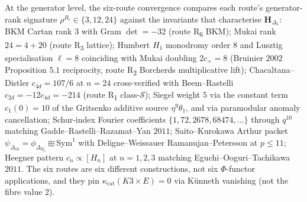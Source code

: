 \begin{remark}
\label{rem:cy-c-six-routes-genlevel-unified-comparison}
At the generator level, the six-route convergence compares each route's
generator-rank signature $\rho^{R_i} \in \{3, 12, 24\}$ against
the invariants that characterise $\mathbf{H}_{\Delta_5}$:
BKM Cartan rank $3$ with Gram $\det = -32$ (route R\textsubscript{6} BKM);
Mukai rank $24 = 4 + 20$ (route R\textsubscript{3} lattice);
Humbert $H_1$ monodromy order $8$ and Lusztig specialisation $\ell = 8$
coinciding with Mukai doubling $2 c_+ = 8$ (Bruinier $2002$ Proposition $5.1$
reciprocity, route R\textsubscript{2} Borcherds multiplicative lift);
Chacaltana--Distler $c_{4d} = 107/6$ at $n = 24$ cross-verified with
Beem--Rastelli $c_{2d} = -12 c_{4d} = -214$ (route R\textsubscript{1}
class-$\mathcal{S}$); Siegel weight $5$ via the constant term
$c_1(0)=10$ of the Gritsenko additive source $\eta^9\theta_1$,
and via paramodular anomaly cancellation; Schur-index Fourier
coefficients $\{1, 72, 2678, 68474, \ldots\}$ through $q^{10}$ matching
Gadde--Rastelli--Razamat--Yan $2011$; Saito--Kurokawa Arthur
packet $\psi_{\Delta_{10}} = \phi_{\Delta_{E_6}} \boxplus \mathrm{Sym}^1$
with Deligne--Weissauer Ramanujan--Petersson at $p \le 11$; Heegner pattern
$c_n \propto [H_n]$ at $n = 1, 2, 3$ matching Eguchi--Ooguri--Tachikawa $2011$.
The six routes are six different constructions, not six
$\Phi$-functor applications, and they pin
$\kappa_{\mathrm{cat}}(K3 \times E) = 0$ via K\"unneth
vanishing (not the fibre value $2$).
\end{remark}
